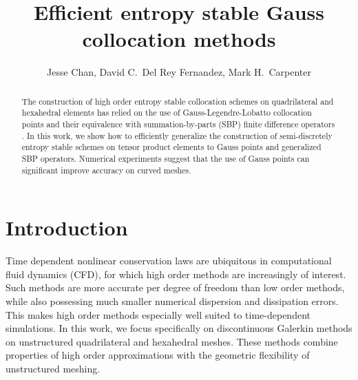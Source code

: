 \documentclass[review,onefignum,onetabnum,final]{siamart171218}
\author{Jesse Chan, David C.\ Del Rey Fernandez, Mark H.\ Carpenter}
\title{Efficient entropy stable Gauss collocation methods}
\begin{document}
\maketitle

\begin{abstract}
The construction of high order entropy stable collocation schemes on quadrilateral and hexahedral elements has relied on the use of Gauss-Legendre-Lobatto collocation points \cite{fisher2013high, carpenter2014entropy, gassner2016split} and their equivalence with summation-by-parts (SBP) finite difference operators \cite{gassner2013skew}.  In this work, we show how to efficiently generalize the construction of semi-discretely entropy stable schemes on tensor product elements to Gauss points and generalized SBP operators.  Numerical experiments suggest that the use of Gauss points can significant improve accuracy on curved meshes.  
\end{abstract}

\section{Introduction}

Time dependent nonlinear conservation laws are ubiquitous in computational fluid dynamics (CFD), for which high order methods are increasingly of interest.  Such methods are more accurate per degree of freedom than low order methods, while also possessing much smaller numerical dispersion and dissipation errors.  This makes high order methods especially well suited to time-dependent simulations.  In this work, we focus specifically on discontinuous Galerkin methods on unstructured quadrilateral and hexahedral meshes.  These methods combine properties of high order approximations with the geometric flexibility of unstructured meshing.  %
\end{document}

